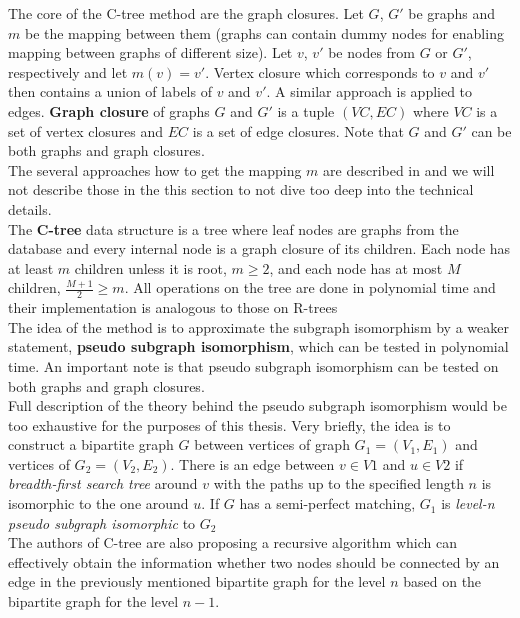 The core of the C-tree method are the graph closures. Let $ G $, $ G' $ be graphs and $ m $ be the mapping between them (graphs can contain dummy nodes for enabling mapping between graphs of different size). Let $ v $, $ v' $ be nodes from $ G $ or $ G' $, respectively and let $ m(v) = v' $. Vertex closure which corresponds to $ v $ and $ v' $ then contains a union of labels of $ v $ and $ v' $. A similar approach is applied to edges. \textbf{Graph closure} of graphs $ G $ and $ G' $ is a tuple $ (VC, EC) $ where $ VC $ is a set of vertex closures and $ EC $ is a set of edge closures. Note that $ G $ and $ G' $ can be both graphs and graph closures.\\

The several approaches how to get the mapping $m$ are described in\cite{CTree} and we will not describe those in the this section to not dive too deep into the technical details.\\

The \textbf{C-tree} data structure is a tree where leaf nodes are graphs from the database and every internal node is a graph closure of its children. Each node has at least $ m $ children unless it is root, $ m \geq 2 $, and each node has at most $ M $ children, $ \frac{M+1}{2} \geq m $. All operations on the tree are done in polynomial time and their implementation is analogous to those on R-trees \cite{RTrees}\\

The idea of the method is to approximate the subgraph isomorphism by a weaker statement, \textbf{pseudo subgraph isomorphism}, which can be tested in polynomial time. An important note is that pseudo subgraph isomorphism can be tested on both graphs and graph closures.\\

Full description of the theory behind the pseudo subgraph isomorphism would be too exhaustive for the purposes of this thesis. Very briefly, the idea is to construct a bipartite graph $G$ between vertices of graph $G_{1}=(V_{1}, E_{1})$ and vertices of $G_{2}=(V_{2}, E_{2})$. There is an edge between $v \in V1$ and $u \in V2$ if \textit{breadth-first search tree} around $v$ with the paths up to the specified length $n$ is isomorphic to the one around $u$. If $G$ has a semi-perfect matching, $G_{1}$ is \textit{level-n pseudo subgraph isomorphic} to $G_{2}$\\

The authors of C-tree are also proposing a recursive algorithm which can effectively obtain the information whether two nodes should be connected by an edge in the previously mentioned bipartite graph for the level $n$ based on the bipartite graph for the level $n-1$.\\

